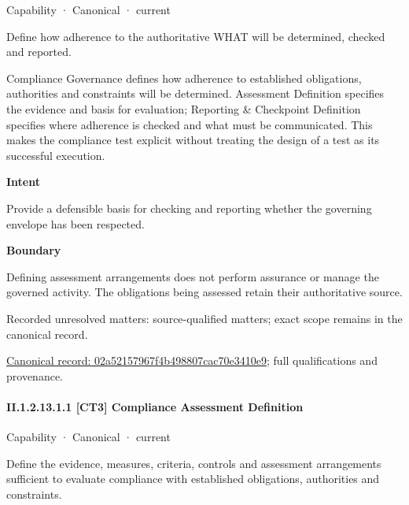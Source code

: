 \label{element:02a52157967f4b498807cac70e3410e9}
{\small Capability · Canonical · current}\par

Define how adherence to the authoritative WHAT will be determined, checked and reported.



Compliance Governance defines how adherence to established obligations, authorities and constraints will be determined. Assessment Definition specifies the evidence and basis for evaluation; Reporting \& Checkpoint Definition specifies where adherence is checked and what must be communicated. This makes the compliance test explicit without treating the design of a test as its successful execution.



\textbf{Intent}



Provide a defensible basis for checking and reporting whether the governing envelope has been respected.



\textbf{Boundary}



Defining assessment arrangements does not perform assurance or manage the governed activity. The obligations being assessed retain their authoritative source.


{\small Recorded unresolved matters: source-qualified matters; exact scope remains in the canonical record.}\par
{\footnotesize \href{../../../../../../../continuum/strategy/capability/02a52157967f4b498807cac70e3410e9.md}{Canonical record: 02a52157967f4b498807cac70e3410e9}; full qualifications and provenance.}\par
\paragraph*{II.1.2.13.1.1 [CT3] Compliance Assessment Definition}
\label{navigation:II.1.2.13.1.1}

\label{element:8a6db4bd0ed845dda125896c4e3ad3d0}
{\small Capability · Canonical · current}\par

Define the evidence, measures, criteria, controls and assessment arrangements sufficient to evaluate compliance with established obligations, authorities and constraints.



